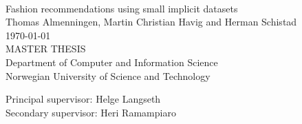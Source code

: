 \documentclass[10pt,a4paper,oneside]{report}
\newcommand{\HRule}{\rule{\linewidth}{0.5mm}} %
\def \thesistitle{Fashion recommendations using small implicit datasets}
\def \authorname{Thomas Almenningen, Martin Christian Havig and Herman Schistad}
\def \supheri{Heri Ramampiaro}
\def \suphelge{Helge Langseth}
\begin{document}

\begin{titlepage}
\begin{center}
\mbox{}\\[6pc]
\begin{center}
\Huge{\thesistitle}\\[2pc]

\Large{\authorname}\\[1pc]
\large{\today}\\[2pc]

MASTER THESIS\\
Department of Computer and Information Science\\
Norwegian University of Science and Technology
\end{center}
\vfill

\noindent Principal supervisor: \suphelge \\
\noindent Secondary supervisor: \supheri

%



\end{center}
\end{titlepage}
\end{document}
